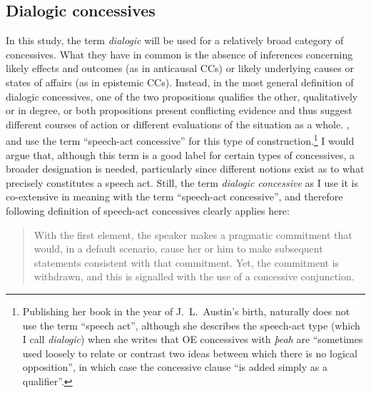 \subsection{\label{bkm:Ref426019070}Dialogic concessives}\label{sec:2.2.3}

In this study, the term \textit{dialogic} will be used for a relatively broad category of concessives. What they have in common is the absence of inferences concerning likely effects and outcomes (as in anticausal CCs) or likely underlying causes or states of affairs (as in epistemic CCs). Instead, in the most general definition of dialogic concessives, one of the two propositions qualifies the other, qualitatively or in degree, or both propositions present conflicting evidence and thus suggest different courses of action or different evaluations of the situation as a whole. \citet{Sweetser1990}, \citet{Crevels2000} and \citet{Hilpert2013a} use the term “speech-act concessive” for this type of construction.\footnote{\label{bkm:Ref82082041}Publishing her book in the year of J.~L.~Austin’s birth, \citet[33]{Burnham1911} naturally does not use the term “speech act”, although she describes the speech-act type (which I call \textit{dialogic}) when she writes that OE concessives with \textit{þeah} are “sometimes used loosely to relate or contrast two ideas between which there is no logical opposition”, in which case the concessive clause “is added simply as a qualifier”.} I would argue that, although this term is a good label for certain types of concessives, a broader designation is needed, particularly since different notions exist as to what precisely constitutes a speech act. Still, the term \textit{dialogic concessive} as I use it is co-extensive in meaning with the term “speech-act concessive”, and therefore  following definition of speech-act concessives clearly applies here:

\begin{quote}
With the first element, the speaker makes a pragmatic commitment that would, in a default scenario, cause her or him to make subsequent statements consistent with that commitment. Yet, the commitment is withdrawn, and this is signalled with the use of a concessive conjunction.
\end{quote}

